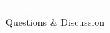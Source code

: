 \documentclass[10pt, aspectratio=169]{beamer}
\begin{document}
{
\begin{frame}[standout]
  \Huge \textcolor{white}{Thank You}\\[0.5cm]
  \large \textcolor{white!80!aliceblue}{Questions \& Discussion}
\end{frame}
}

\end{document}
